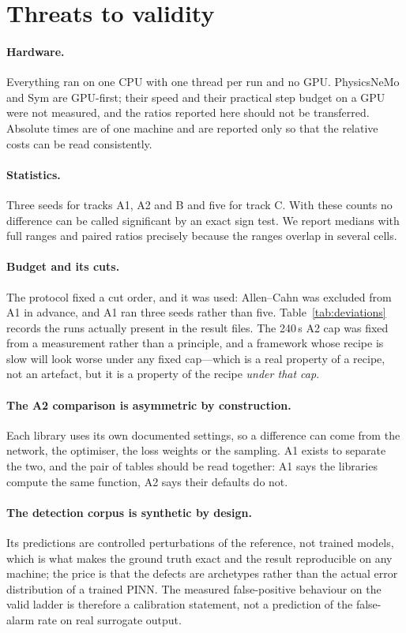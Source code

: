 \documentclass[11pt]{article}
\begin{document}
\section{Threats to validity}\label{sec:threats}

\paragraph{Hardware.} Everything ran on one CPU with one thread per run and no GPU. PhysicsNeMo and
Sym are GPU-first; their speed and their practical step budget on a GPU were not measured, and the
ratios reported here should not be transferred. Absolute times are of one machine and are reported
only so that the relative costs can be read consistently.

\paragraph{Statistics.} Three seeds for tracks A1, A2 and B and five for track C. With these counts
no difference can be called significant by an exact sign test. We report medians with full ranges and
paired ratios precisely because the ranges overlap in several cells.

\paragraph{Budget and its cuts.} The protocol fixed a cut order, and it was used: Allen--Cahn was
excluded from A1 in advance, and A1 ran three seeds rather than five. Table~\ref{tab:deviations}
records the runs actually present in the result files. The 240\,s A2 cap was fixed from a
measurement rather than a principle, and a framework whose recipe is slow will look worse under any
fixed cap---which is a real property of a recipe, not an artefact, but it is a property of the recipe
\emph{under that cap}.

\paragraph{The A2 comparison is asymmetric by construction.} Each library uses its own documented
settings, so a difference can come from the network, the optimiser, the loss weights or the sampling.
A1 exists to separate the two, and the pair of tables should be read together: A1 says the libraries
compute the same function, A2 says their defaults do not.

\paragraph{The detection corpus is synthetic by design.} Its predictions are controlled perturbations
of the reference, not trained models, which is what makes the ground truth exact and the result
reproducible on any machine; the price is that the defects are archetypes rather than the actual
error distribution of a trained PINN. The measured false-positive behaviour on the valid ladder is
therefore a calibration statement, not a prediction of the false-alarm rate on real surrogate output.
\end{document}
